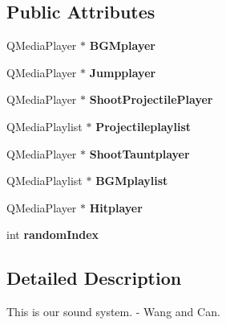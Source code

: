 \subsection*{Public Attributes}
\begin{DoxyCompactItemize}
\item 
Q\+Media\+Player $\ast$ {\bfseries B\+G\+Mplayer}\hypertarget{class_sound_player_a25abf7c254031e70644c8cfa1a68435b}{}\label{class_sound_player_a25abf7c254031e70644c8cfa1a68435b}

\item 
Q\+Media\+Player $\ast$ {\bfseries Jumpplayer}\hypertarget{class_sound_player_a86b10cfd0f29c18fe0a94404478d095c}{}\label{class_sound_player_a86b10cfd0f29c18fe0a94404478d095c}

\item 
Q\+Media\+Player $\ast$ {\bfseries Shoot\+Projectile\+Player}\hypertarget{class_sound_player_aab7b527b4921f87a2b0bd494cd828526}{}\label{class_sound_player_aab7b527b4921f87a2b0bd494cd828526}

\item 
Q\+Media\+Playlist $\ast$ {\bfseries Projectileplaylist}\hypertarget{class_sound_player_a14cee008aef550823022a55cea818b73}{}\label{class_sound_player_a14cee008aef550823022a55cea818b73}

\item 
Q\+Media\+Player $\ast$ {\bfseries Shoot\+Tauntplayer}\hypertarget{class_sound_player_ac5bf3fd5e40398eb110bea4453a49e55}{}\label{class_sound_player_ac5bf3fd5e40398eb110bea4453a49e55}

\item 
Q\+Media\+Playlist $\ast$ {\bfseries B\+G\+Mplaylist}\hypertarget{class_sound_player_a60736c5dd9e218a3f913c9a73883cdb6}{}\label{class_sound_player_a60736c5dd9e218a3f913c9a73883cdb6}

\item 
Q\+Media\+Player $\ast$ {\bfseries Hitplayer}\hypertarget{class_sound_player_a4ff5a304d4c03a315fbd442e92553cd0}{}\label{class_sound_player_a4ff5a304d4c03a315fbd442e92553cd0}

\item 
int {\bfseries random\+Index}\hypertarget{class_sound_player_aa3bf410aa75678aad3ab72ed50e43e02}{}\label{class_sound_player_aa3bf410aa75678aad3ab72ed50e43e02}

\end{DoxyCompactItemize}


\subsection{Detailed Description}
This is our sound system. -\/ Wang and Can. 

